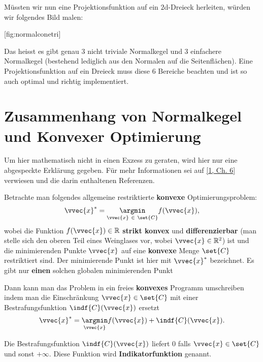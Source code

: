 \documentclass[
  12pt,
  british,
  a4paper,
  twoside,
  titlepage,
  openright,
  numbers=noenddot,
  chapterprefix=true,
  headings=optiontohead,
  svgnames,
  dvipsnames]{scrreprt}
\begin{document}
Müssten wir nun eine Projektionsfunktion auf ein \(2\)d-Dreieck
herleiten, würden wir folgendes Bild malen:

[fig:normalconetri]

Das heisst es gibt genau 3 nicht triviale Normalkegel und 3 einfachere
Normalkegel (bestehend lediglich aus den Normalen auf die
Seitenflächen). Eine Projektionsfunktion auf ein Dreieck muss diese 6
Bereiche beachten und ist so auch optimal und richtig implementiert.

\hypertarget{zusammenhang-von-normalkegel-und-konvexer-optimierung}{%
\section{Zusammenhang von Normalkegel und Konvexer
Optimierung}\label{zusammenhang-von-normalkegel-und-konvexer-optimierung}}

Um hier mathematisch nicht in einen Exzess zu geraten, wird hier nur
eine abgespeckte Erklärung gegeben. Für mehr Informationen sei auf
\protect\hyperlink{ref-nuetzig_thesis_2016}{{[}1, Ch. 6{]}} verwiesen
und die darin enthaltenen Referenzen.

Betrachte man folgendes allgemeine restriktierte \textbf{konvexe}
Optimierungsproblem:
\begin{align} \vvec{x}^* = \underset{\vvec{x} \ \in \ \set{C}}{\argmin} f(\vvec{x}), \label{eq:convexproblem} \end{align}
wobei die Funktion \(f(\vvec{x}) \in \mathbb{R}\) \textbf{strikt konvex}
und \textbf{differenzierbar} (man stelle sich den oberen Teil eines
Weinglases vor, wobei \(\vvec{x} \in \mathbb{R}^2\)) ist und die
minimierenden Punkte \(\vvec{x}\) auf eine \textbf{konvexe} Menge
\(\set{C}\) restriktiert sind. Der minimierende Punkt ist hier mit
\(\vvec{x}^*\) bezeichnet. Es gibt nur \textbf{einen} solchen globalen
minimierenden Punkt

Dann kann man das Problem in ein freies \textbf{konvexes} Programm
umschreiben indem man die Einschränkung \(\vvec{x} \in \set{C}\) mit
einer Bestrafungsfunktion \(\indf{C}(\vvec{x})\) ersetzt
\begin{align} \vvec{x}^* = \underset{\vvec{x}}{\argmin} f(\vvec{x}) + \indf{C}(\vvec{x}). \end{align}

Die Bestrafungsfunktion \(\indf{C}(\vvec{x})\) liefert \(0\) falls
\(\vvec{x} \in \set{C}\) und sonst \(+\infty\). Diese Funktion wird
\textbf{Indikatorfunktion} genannt.
\end{document}
